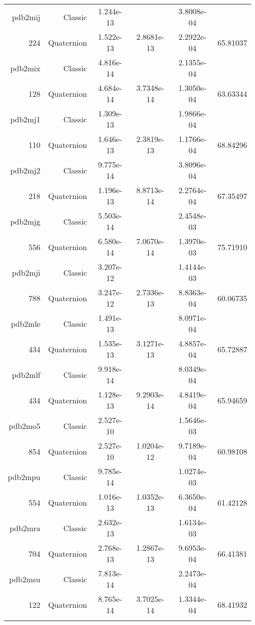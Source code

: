 \begin{xltabular}{\textwidth}{r|rS[table-format=1.3e+2]S[table-format=1.4e+2]S[table-format=1.4e+2]S[table-format=-1.5]}
pdb2mij & Classic & 1.244e-13 &  & 3.8008e-04 & \\
224 & Quaternion & 1.522e-13 & 2.8681e-13 & 2.2922e-04 & 65.81037\\  \addlinespace
pdb2mix & Classic & 4.816e-14 &  & 2.1355e-04 & \\
128 & Quaternion & 4.684e-14 & 3.7348e-14 & 1.3050e-04 & 63.63344\\  \addlinespace
pdb2mj1 & Classic & 1.309e-13 &  & 1.9866e-04 & \\
110 & Quaternion & 1.646e-13 & 2.3819e-13 & 1.1766e-04 & 68.84296\\  \addlinespace
pdb2mj2 & Classic & 9.775e-14 &  & 3.8096e-04 & \\
218 & Quaternion & 1.196e-13 & 8.8713e-14 & 2.2764e-04 & 67.35497\\  \addlinespace
pdb2mjg & Classic & 5.503e-14 &  & 2.4548e-03 & \\
556 & Quaternion & 6.580e-14 & 7.0670e-14 & 1.3970e-03 & 75.71910\\  \addlinespace
pdb2mji & Classic & 3.207e-12 &  & 1.4144e-03 & \\
788 & Quaternion & 3.247e-12 & 2.7336e-13 & 8.8363e-04 & 60.06735\\  \addlinespace
pdb2mle & Classic & 1.491e-13 &  & 8.0971e-04 & \\
434 & Quaternion & 1.535e-13 & 3.1271e-13 & 4.8857e-04 & 65.72887\\  \addlinespace
pdb2mlf & Classic & 9.918e-14 &  & 8.0349e-04 & \\
434 & Quaternion & 1.128e-13 & 9.2903e-14 & 4.8419e-04 & 65.94659\\  \addlinespace
pdb2mo5 & Classic & 2.527e-10 &  & 1.5646e-03 & \\
854 & Quaternion & 2.527e-10 & 1.0204e-12 & 9.7189e-04 & 60.98108\\  \addlinespace
pdb2mpu & Classic & 9.785e-14 &  & 1.0274e-03 & \\
554 & Quaternion & 1.016e-13 & 1.0352e-13 & 6.3650e-04 & 61.42128\\  \addlinespace
pdb2mra & Classic & 2.632e-13 &  & 1.6134e-03 & \\
704 & Quaternion & 2.768e-13 & 1.2867e-13 & 9.6953e-04 & 66.41381\\  \addlinespace
pdb2msu & Classic & 7.813e-14 &  & 2.2473e-04 & \\
122 & Quaternion & 8.765e-14 & 3.7025e-14 & 1.3344e-04 & 68.41932\\  \addlinespace

\end{xltabular}
